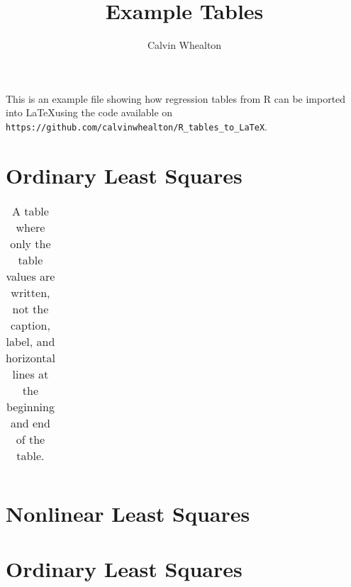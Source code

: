 \documentclass{article}
\title{Example Tables}
\author{Calvin Whealton}
\begin{document}
\maketitle

\listoftables

\newpage

This is an example file showing how regression tables from R can be imported into \LaTeX using the code available on \texttt{https://github.com/calvinwhealton/R\_tables\_to\_LaTeX}.


\section{Ordinary Least Squares}

\begin{table}[h!]
\caption{A table where only the table values are written, not the caption, label, and horizontal lines at the beginning and end of the table.}\label{ols1}
\begin{center}
\begin{tabular}{l l l l l}
\hline

\hline
\end{tabular}
\end{center}
\end{table}



\section{Nonlinear Least Squares}


\section{Ordinary Least Squares}
\end{document}
